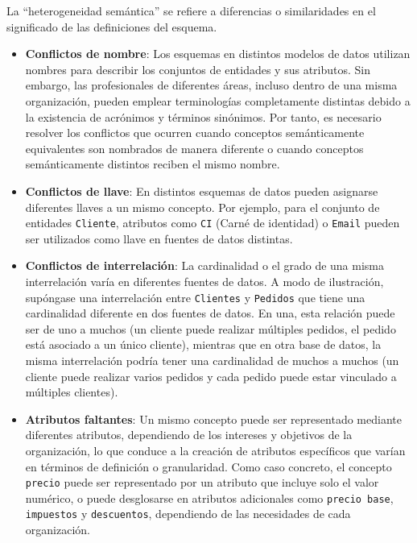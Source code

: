         La ``heterogeneidad semántica'' se refiere a diferencias o similaridades en el significado de las definiciones del esquema.

        \begin{itemize}
            \item \textbf{Conflictos de nombre}: Los esquemas en distintos modelos de datos utilizan nombres para describir los conjuntos
            de entidades y sus atributos. Sin embargo, las profesionales de diferentes áreas, incluso dentro de una misma organización, pueden emplear
            terminologías completamente distintas debido a la existencia de acrónimos y
            términos sinónimos. Por tanto, es necesario resolver
            los conflictos que ocurren cuando conceptos semánticamente equivalentes son nombrados de manera
            diferente o cuando conceptos semánticamente distintos reciben el mismo nombre.
            \item \textbf{Conflictos de llave}: En distintos esquemas de datos pueden asignarse diferentes llaves a un mismo concepto. Por ejemplo, para
            el conjunto de entidades \texttt{Cliente}, atributos como \texttt{CI} (Carné de identidad) o \texttt{Email} pueden ser utilizados como llave
            en fuentes de datos distintas.
            \item \textbf{Conflictos de interrelación}: La cardinalidad o el grado de una misma interrelación varía en diferentes fuentes de datos. 
            A modo de ilustración, supóngase una interrelación entre \texttt{Clientes} y \texttt{Pedidos} que tiene una cardinalidad diferente en dos fuentes de datos. 
            En una, esta relación puede ser de uno a muchos (un cliente puede realizar múltiples pedidos, el pedido está asociado a un único cliente), 
            mientras que en otra base de datos, la misma interrelación podría tener una cardinalidad de 
            muchos a muchos (un cliente puede realizar varios pedidos y cada pedido puede estar vinculado a múltiples clientes).
            \item \textbf{Atributos faltantes}: Un mismo concepto puede ser representado mediante diferentes atributos, dependiendo de los intereses y objetivos de la organización, lo que conduce a la creación de atributos específicos que varían en términos de definición o granularidad. 
            Como caso concreto, el concepto \texttt{precio} puede ser representado por un atributo que incluye solo el valor numérico, o puede desglosarse en atributos adicionales como \texttt{precio base}, \texttt{impuestos} y \texttt{descuentos},
            dependiendo de las necesidades de cada organización.
        \end{itemize}


